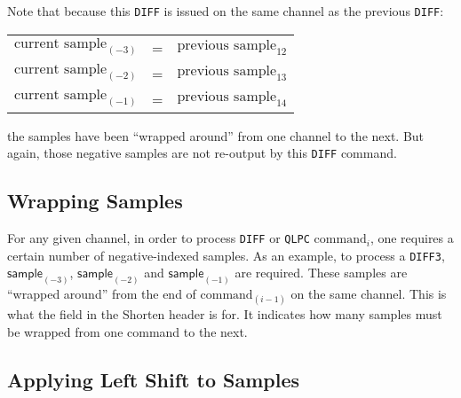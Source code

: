\par
\noindent
Note that because this \texttt{DIFF} is issued on the same channel
as the previous \texttt{DIFF}:
\begin{table}[h]
\begin{tabular}{rcl}
  $\text{current sample}_{(-3)}$ & = & $\text{previous sample}_{12}$ \\
  $\text{current sample}_{(-2)}$ & = & $\text{previous sample}_{13}$ \\
  $\text{current sample}_{(-1)}$ & = & $\text{previous sample}_{14}$ \\
\end{tabular}
\end{table}
\par
\noindent
the samples have been ``wrapped around'' from one channel to the next.
But again, those negative samples are not re-output by
this \texttt{DIFF} command.

\clearpage

\subsection{Wrapping Samples}
\label{shorten:wrap_samples}

For any given channel, in order to process \texttt{DIFF} or
\texttt{QLPC} $\text{command}_i$,
one requires a certain number of negative-indexed samples.
As an example, to process a \texttt{DIFF3},
$\textsf{sample}_{(-3)}$, $\textsf{sample}_{(-2)}$ and $\textsf{sample}_{(-1)}$
are required.
These samples are ``wrapped around'' from the end of $\text{command}_{(i - 1)}$
on the same channel.
This is what the  field in the Shorten header is for.
It indicates how many samples must be wrapped from one command
to the next.

\subsection{Applying Left Shift to Samples}
\label{shorten:apply_leftshift}
\EALGORITHM

